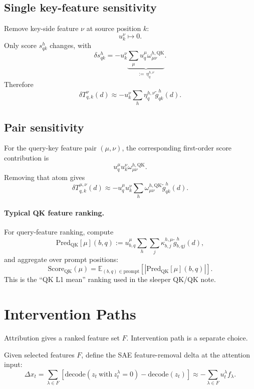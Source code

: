 \documentclass[11pt]{article}
\newcommand{\E}{\mathbb{E}}
\newcommand{\QK}{\mathrm{QK}}
\theoremstyle{definition}
\theoremstyle{plain}
\theoremstyle{remark}
\begin{document}
\subsection{Single key-feature sensitivity}

Remove key-side feature \(\nu\) at source position \(k\):
\[
  u_k^\nu \mapsto 0.
\]
Only score \(s_{qk}^h\) changes, with
\[
  \delta s_{qk}^h
  =
  -
  u_k^\nu
  \underbrace{
  \sum_\mu u_q^\mu \omega_{\mu\nu}^{h,\QK}
  }_{:=\,\eta_q^{h,\nu}}.
\]
Therefore
\[
  \delta T_{q,k}^{\nu}(d)
  \approx
  -
  u_k^\nu
  \sum_h
  \eta_q^{h,\nu}
  \widetilde g_{qk}^h(d).
\]

\subsection{Pair sensitivity}

For the query-key feature pair \((\mu,\nu)\), the corresponding first-order
score contribution is
\[
  u_q^\mu u_k^\nu \omega_{\mu\nu}^{h,\QK}.
\]
Removing that atom gives
\[
  \delta T_{q,k}^{\mu,\nu}(d)
  \approx
  -
  u_q^\mu u_k^\nu
  \sum_h
  \omega_{\mu\nu}^{h,\QK}
  \widetilde g_{qk}^h(d).
\]

\paragraph{Typical QK feature ranking.}
For query-feature ranking, compute
\[
  \mathrm{Pred}_{\QK}[\mu](b,q)
  :=
  u_{b,q}^\mu
  \sum_h \sum_j
  \kappa_{b,j}^{h,\mu}
  \widetilde g_{b,qj}^h(d),
\]
and aggregate over prompt positions:
\[
  \mathrm{Score}_{\QK}(\mu)
  =
  \E_{(b,q)\in \mathrm{prompt}}
  \left[
    \left|\mathrm{Pred}_{\QK}[\mu](b,q)\right|
  \right].
\]
This is the ``QK L1 mean'' ranking used in the sleeper QK/QK note.

\section{Intervention Paths}

Attribution gives a ranked feature set \(F\).  Intervention path is a separate
choice.

Given selected features \(F\), define the SAE feature-removal delta at the
attention input:
\[
  \Delta x_t
  =
  \sum_{\lambda \in F}
  \left[
    \mathrm{decode}(z_t \ \mathrm{with}\ z_t^\lambda=0)
    -
    \mathrm{decode}(z_t)
  \right]
  \approx
  -
  \sum_{\lambda \in F} u_t^\lambda f_\lambda.
\]
\end{document}
